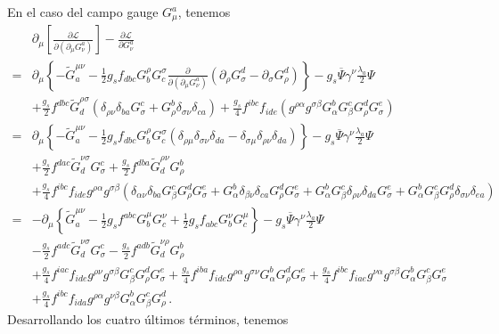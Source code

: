 En el caso del campo gauge $G_{\mu}^{a}$, tenemos
\begin{align}
  &\partial_\mu\left[\frac{\partial\mathcal{L}}{\partial\left(\partial_\mu G_\nu^a\right)}\right]-\frac{\partial\mathcal{L}}{\partial G_\nu^a}\nonumber\\
=&\partial_\mu\left\{-  \widetilde{G}^{\mu\nu}_a-\frac{1}{2}g_s f_{dbc}G_b^\rho G^\sigma_c\frac{\partial}{\partial\left(\partial_\mu G_\nu^a\right)}
\left(\partial_\rho G_\sigma^d-\partial_\sigma G_\rho^d\right)\right\}
-g_s\overline{\Psi}\gamma^\nu\frac{\lambda_a}{2}\Psi\nonumber\\
&+\frac{g_s}{2} f^{dbc}\widetilde{G}^{\rho\sigma}_d(\delta_{\rho\nu}\delta_{ba}G^c_\sigma+G^b_\rho\delta_{\sigma\nu}\delta_{ca})
+\frac{g_s}{4}f^{ibc}f_{ide}(g^{\rho\alpha}g^{\sigma\beta}G^b_{\alpha}G^c_\beta G^d_\rho G^e_\sigma)\nonumber\\
  =&\partial_\mu\left\{- \widetilde{G}^{\mu\nu}_a-\frac{1}{2}g_s f_{dbc}G_b^\rho G^\sigma_c
\left(\delta_{\rho\mu}\delta_{\sigma\nu}\delta_{da}-\delta_{\sigma\mu}\delta_{\rho\nu}\delta_{da}\right)\right\}
-g_s\overline{\Psi}\gamma^\nu\frac{\lambda_a}{2}\Psi\nonumber\\
&+\frac{g_s}{2} f^{dac}\widetilde{G}^{\nu\sigma}_dG^c_\sigma
+\frac{g_s}{2} f^{dba}\widetilde{G}^{\rho\nu}_dG^b_\rho\nonumber\\
&+\frac{g_s}{4}f^{ibc}f_{ide}g^{\rho\alpha}g^{\sigma\beta}(\delta_{\alpha\nu}\delta_{ba}G^c_\beta G^d_\rho G^e_\sigma+G^b_{\alpha}\delta_{\beta\nu}\delta_{ca}G^d_\rho G^e_\sigma+G^b_{\alpha}G^c_\beta\delta_{\rho\nu}\delta_{da}G^e_\sigma+G^b_{\alpha}G^c_\beta G^d_\rho\delta_{\sigma\nu}\delta_{ea})\nonumber\\
  =&-\partial_\mu\left\{  \widetilde{G}^{\mu\nu}_a-\frac{1}{2}g_s f^{abc}G_b^\mu G^\nu_c
+\frac{1}{2}g_s f_{abc}G_b^\nu G^\mu_c\right\}
-g_s\overline{\Psi}\gamma^\nu\frac{\lambda_a}{2}\Psi\nonumber\\
&-\frac{g_s}{2} f^{adc}\widetilde{G}^{\nu\sigma}_dG^c_\sigma
-\frac{g_s}{2} f^{adb}\widetilde{G}^{\nu\rho}_dG^b_\rho\nonumber\\
&+\frac{g_s}{4}f^{iac}f_{ide}g^{\rho\nu}g^{\sigma\beta}G^c_\beta G^d_\rho G^e_\sigma
+\frac{g_s}{4}f^{iba}f_{ide}g^{\rho\alpha}g^{\sigma\nu}G^b_{\alpha}G^d_\rho G^e_\sigma
+\frac{g_s}{4}f^{ibc}f_{iae}g^{\nu\alpha}g^{\sigma\beta}G^b_{\alpha}G^c_\beta G^e_\sigma\nonumber\\
&+\frac{g_s}{4}f^{ibc}f_{ida}g^{\rho\alpha}g^{\nu\beta}G^b_{\alpha}G^c_\beta G^d_\rho\,.
\end{align}
Desarrollando los cuatro últimos términos, tenemos


